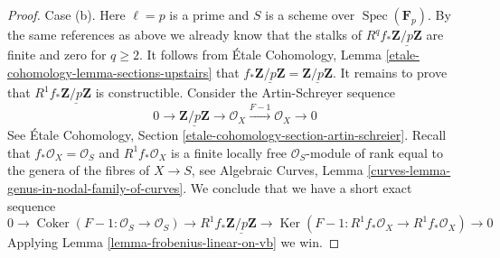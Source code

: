 \documentclass{stacks-project}
\theoremstyle{plain}
\theoremstyle{definition}
\theoremstyle{remark}
\numberwithin{equation}{subsection}
\def\Spec{\mathop{\mathrm{Spec}}}
\def\Ker{\mathop{\mathrm{Ker}}}
\def\Coker{\mathop{\mathrm{Coker}}}
\begin{document}
\begin{proof}
\medskip\noindent
Case (b). Here $\ell = p$ is a prime and $S$ is a scheme over
$\Spec(\mathbf{F}_p)$. By the same references as above we already
know that the stalks of $R^qf_*\underline{\mathbf{Z}/p\mathbf{Z}}$
are finite and zero for $q \geq 2$. It follows from
\'Etale Cohomology, Lemma \ref{etale-cohomology-lemma-sections-upstairs}
that $f_*\underline{\mathbf{Z}/p\mathbf{Z}} =
\underline{\mathbf{Z}/p\mathbf{Z}}$. It remains to prove
that $R^1f_*\underline{\mathbf{Z}/p\mathbf{Z}}$ is constructible.
Consider the Artin-Schreyer sequence
$$
0 \to \underline{\mathbf{Z}/p\mathbf{Z}} \to \mathcal{O}_X
\xrightarrow{F - 1} \mathcal{O}_X
\to 0
$$
See \'Etale Cohomology, Section \ref{etale-cohomology-section-artin-schreier}.
Recall that $f_*\mathcal{O}_X = \mathcal{O}_S$ and
$R^1f_*\mathcal{O}_X$ is a finite locally free $\mathcal{O}_S$-module
of rank equal to the genera of the fibres of $X \to S$, see
Algebraic Curves, Lemma \ref{curves-lemma-genus-in-nodal-family-of-curves}.
We conclude that we have a short exact sequence
$$
0 \to
\Coker(F - 1 : \mathcal{O}_S \to \mathcal{O}_S)
\to R^1f_*\underline{\mathbf{Z}/p\mathbf{Z}} \to
\Ker(F - 1 : R^1f_*\mathcal{O}_X \to R^1f_*\mathcal{O}_X)
\to 0
$$
Applying Lemma \ref{lemma-frobenius-linear-on-vb} we win.
\end{proof}
\end{document}
